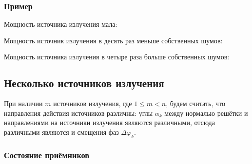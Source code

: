 \subsubsection{Пример}

Мощность источника излучения мала:

Мощность источник излучения в десять раз меньше собственных шумов:

Мощность источника излучения в четыре раза больше собственных шумов:

\subsection{Несколько источников излучения}

При наличии $m$ источников излучения, где $1 \le m < n$, будем считать, что направления действия источников различны: углы $\alpha_k$ между нормалью решётки и направлениями
на источники излучения являются различными, отсюда различными являются и смещения фаз $\Delta \varphi_k$.

\subsubsection{Состояние приёмников}

